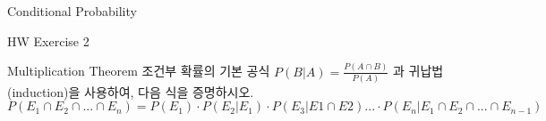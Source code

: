 \begin{edXchapter}{Conditional Probability}
\begin{edXsection}{HW Exercise 2}
\begin{edXvertical}
\begin{edXproblem}{Multiplication Theorem}
조건부 확률의 기본 공식 $P(B|A) = \frac{P(A \cap B)}{P(A)}$ 과 귀납법(induction)을 사용하여,
다음 식을 증명하시오.
\begin{equation}
P(E_1 \cap E_2 \cap ... \cap E_n) = P(E_1) \cdot P(E_2|E_1) \cdot P(E_3 | E1 \cap E2)...\cdot P(E_n | E_1 \cap E_2 \cap ... \cap E_{n-1})
\end{equation}
\end{edXproblem}

\end{edXvertical}
\end{edXsection}
\end{edXchapter}




 

 


